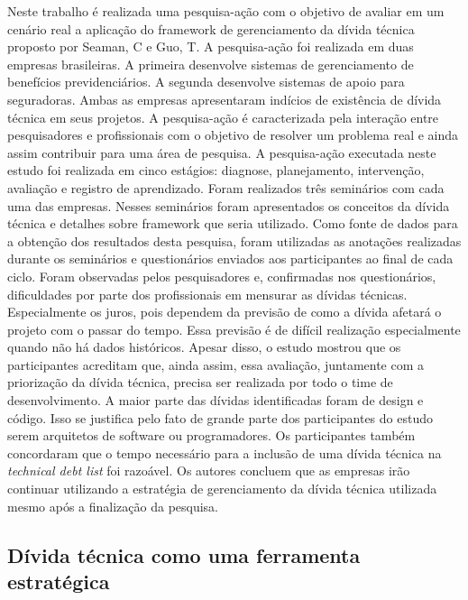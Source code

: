 Neste trabalho\cite{oliveira2015managing} é realizada uma pesquisa-ação com o objetivo de avaliar em um cenário real a aplicação do framework de gerenciamento da dívida técnica proposto por Seaman, C e Guo, T\cite{seaman2011measuring}. A pesquisa-ação foi realizada em duas empresas brasileiras. A primeira desenvolve sistemas de gerenciamento de benefícios previdenciários. A segunda desenvolve sistemas de apoio para seguradoras. Ambas as empresas apresentaram indícios de existência de dívida técnica em seus projetos.  A pesquisa-ação é caracterizada pela interação entre pesquisadores e profissionais com o objetivo de resolver um problema real e ainda assim contribuir para uma área de pesquisa. A pesquisa-ação executada neste estudo foi realizada em cinco estágios: diagnose, planejamento, intervenção, avaliação e registro de aprendizado.  Foram realizados três seminários com cada uma das empresas. Nesses seminários foram apresentados os conceitos da dívida técnica e detalhes sobre framework que seria utilizado. 
Como fonte de dados para  a obtenção dos resultados desta pesquisa, foram utilizadas as anotações realizadas durante os seminários e questionários enviados aos participantes ao final de cada ciclo.  Foram observadas pelos pesquisadores e, confirmadas nos questionários, dificuldades por parte dos profissionais em mensurar as dívidas técnicas. Especialmente os juros, pois dependem da previsão de como a dívida afetará o projeto com o passar do tempo. Essa previsão é de difícil realização especialmente quando não há dados históricos.  Apesar disso, o estudo mostrou que os participantes acreditam que, ainda assim, essa avaliação, juntamente com a priorização da dívida técnica, precisa ser realizada por todo o time de desenvolvimento.  A maior parte das dívidas identificadas foram de design e código. Isso se justifica pelo fato de grande parte dos participantes do estudo serem arquitetos de software ou programadores. Os participantes também concordaram que o tempo necessário para a  inclusão de uma dívida técnica na \textit{technical debt list} foi razoável. Os autores concluem que as empresas irão continuar utilizando a estratégia de gerenciamento da dívida técnica utilizada mesmo após a finalização da pesquisa.  

\subsection{Dívida técnica como uma ferramenta estratégica}


